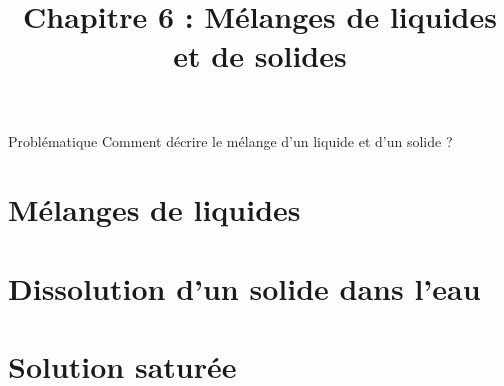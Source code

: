 \documentclass[xcolor={dvipsnames}]{beamer}
\title[Ch 7 : Mélanges de liquides et de solides]{Chapitre 6 : Mélanges de liquides et de solides}
\begin{document}
\begin{frame}
  \titlepage 
\end{frame}


\begin{frame}
\begin{block}{Problématique}
	{\Large Comment décrire le mélange d'un liquide et d'un solide ?}
\end{block}
\end{frame}


\section{Mélanges de liquides}

\begin{frame}


\end{frame}


\section{Dissolution d'un solide dans l'eau}

\begin{frame}


\end{frame}

\section{Solution saturée}

\begin{frame}


\end{frame}
\end{document}
